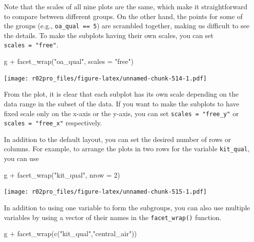\documentclass[
]{book}
\newenvironment{Shaded}{\begin{snugshade}}{\end{snugshade}}
\newcommand{\AttributeTok}[1]{\textcolor[rgb]{0.77,0.63,0.00}{#1}}
\newcommand{\DecValTok}[1]{\textcolor[rgb]{0.00,0.00,0.81}{#1}}
\newcommand{\FunctionTok}[1]{\textcolor[rgb]{0.00,0.00,0.00}{#1}}
\newcommand{\NormalTok}[1]{#1}
\newcommand{\SpecialCharTok}[1]{\textcolor[rgb]{0.00,0.00,0.00}{#1}}
\newcommand{\StringTok}[1]{\textcolor[rgb]{0.31,0.60,0.02}{#1}}
\begin{document}
Note that the scales of all nine plots are the same, which make it straightforward to compare between different groups. On the other hand, the points for some of the groups (e.g., \texttt{oa\_qual\ ==\ 5}) are scrambled together, making us difficult to see the details. To make the subplots having their own scales, you can set \texttt{scales\ =\ "free"}.

\begin{Shaded}
\begin{Highlighting}[]
\NormalTok{g }\SpecialCharTok{+} \FunctionTok{facet\_wrap}\NormalTok{(}\StringTok{"oa\_qual"}\NormalTok{, }\AttributeTok{scales =} \StringTok{"free"}\NormalTok{)}
\end{Highlighting}
\end{Shaded}

\texttt{[image: r02pro\_files/figure-latex/unnamed-chunk-514-1.pdf]}

From the plot, it is clear that each subplot has its own scale depending on the data range in the subset of the data. If you want to make the subplots to have fixed scale only on the x-axis or the y-axis, you can set \texttt{scales\ =\ "free\_y"} or \texttt{scales\ =\ "free\_x"} respectively.

In addition to the default layout, you can set the desired number of rows or columns. For example, to arrange the plots in two rows for the variable \texttt{kit\_qual}, you can use

\begin{Shaded}
\begin{Highlighting}[]
\NormalTok{g }\SpecialCharTok{+} \FunctionTok{facet\_wrap}\NormalTok{(}\StringTok{"kit\_qual"}\NormalTok{, }\AttributeTok{nrow =} \DecValTok{2}\NormalTok{)}
\end{Highlighting}
\end{Shaded}

\texttt{[image: r02pro\_files/figure-latex/unnamed-chunk-515-1.pdf]}

In addition to using one variable to form the subgroups, you can also use multiple variables by using a vector of their names in the \texttt{facet\_wrap()} function.

\begin{Shaded}
\begin{Highlighting}[]
\NormalTok{g }\SpecialCharTok{+} \FunctionTok{facet\_wrap}\NormalTok{(}\FunctionTok{c}\NormalTok{(}\StringTok{"kit\_qual"}\NormalTok{,}\StringTok{"central\_air"}\NormalTok{))}
\end{Highlighting}
\end{Shaded}
\end{document}
